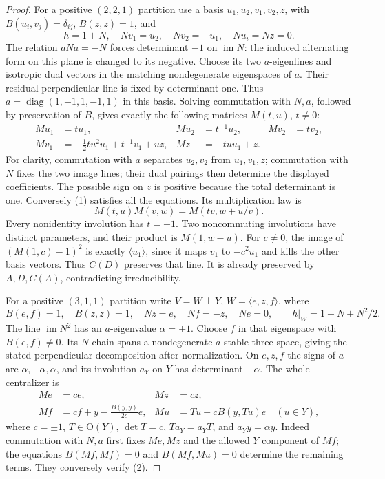 \documentclass[11pt,a4paper]{article}
\newcommand{\gen}[1]{\langle#1\rangle}\newcommand{\Om}{\Omega}
\begin{document}
\begin{proof}
For a positive $(2,2,1)$ partition use a basis $u_1,u_2,v_1,v_2,z$,
with $B(u_i,v_j)=\delta_{ij}$, $B(z,z)=1$, and
\[
 h=1+N,\quad Nv_1=u_2,\quad Nv_2=-u_1,\quad Nu_i=Nz=0.
\]
The relation $aNa=-N$ forces determinant $-1$ on $\operatorname{im}N$: the
induced alternating form on this plane is changed to its negative.
Choose its two $a$-eigenlines and isotropic dual vectors in the matching
nondegenerate eigenspaces of $a$. Their residual perpendicular line
is fixed by determinant one. Thus
$a=\operatorname{diag}(1,-1,1,-1,1)$ in this basis.
Solving commutation with $N,a$, followed by preservation of $B$, gives
exactly the following matrices $M(t,u)$, $t\ne0$:
\[
\begin{aligned}
 Mu_1&=t u_1,&Mu_2&=t^{-1}u_2,&Mv_2&=t v_2,\\
 Mv_1&=-\tfrac12tu^2u_1+t^{-1}v_1+uz,&
 Mz&=-tu u_1+z.
\end{aligned}                                                \tag{1}
\]
For clarity, commutation with $a$ separates $u_2,v_2$ from
$u_1,v_1,z$; commutation with $N$ fixes the two image lines; their
dual pairings then determine the displayed coefficients. The possible
sign on $z$ is positive because the total determinant is one.
Conversely (1) satisfies all the equations. Its multiplication law is
\[
 M(t,u)M(v,w)=M(tv,w+u/v).
\]
Every nonidentity involution has $t=-1$. Two noncommuting involutions
have distinct parameters, and their product is $M(1,w-u)$.
For $c\ne0$, the image of $(M(1,c)-1)^2$ is exactly $\gen{u_1}$,
since it maps $v_1$ to $-c^2u_1$ and kills the other basis vectors.
Thus $C(D)$ preserves that line. It is already preserved by
$A,D,C(A)$, contradicting irreducibility.

For a positive $(3,1,1)$ partition write
$V=W\perp Y$, $W=\gen{e,z,f}$, where
\[
 B(e,f)=1,\quad B(z,z)=1,\quad Nz=e,\quad Nf=-z,\quad Ne=0,
 \qquad h|_W=1+N+N^2/2.
\]
The line $\operatorname{im}N^2$ has an $a$-eigenvalue
$\alpha=\pm1$. Choose $f$ in that eigenspace with $B(e,f)\ne0$.
Its $N$-chain spans a nondegenerate $a$-stable three-space, giving the
stated perpendicular decomposition after normalization. On $e,z,f$
the signs of $a$ are $\alpha,-\alpha,\alpha$, and its involution
$a_Y$ on $Y$ has determinant $-\alpha$. The whole centralizer is
\[
\begin{aligned}
 Me&=c e,&Mz&=c z,\\
 Mf&=c f+y-\tfrac{B(y,y)}{2c}e,&
 Mu&=Tu-cB(y,Tu)e\quad(u\in Y),
\end{aligned}                                               \tag{2}
\]
where $c=\pm1$, $T\in\mathrm O(Y)$, $\det T=c$, $Ta_Y=a_YT$,
and $a_Yy=\alpha y$. Indeed commutation with $N,a$ first fixes
$Me,Mz$ and the allowed $Y$ component of $Mf$; the equations
$B(Mf,Mf)=0$ and $B(Mf,Mu)=0$ determine the remaining terms.
They conversely verify (2).


\end{proof}
\end{document}
